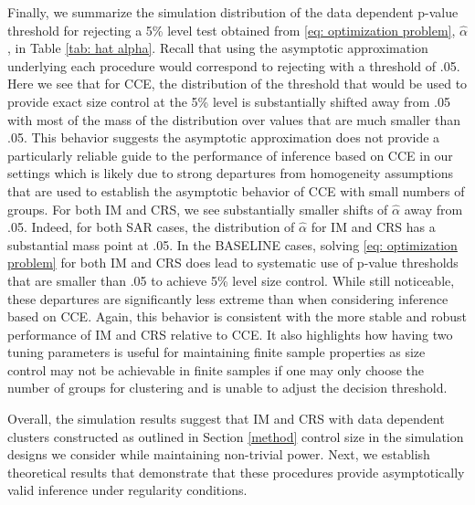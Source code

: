 \documentclass[preprint]{imsart}
\numberwithin{equation}{section}
\theoremstyle{plain}
\theoremstyle{definition}
\renewcommand{\(}{\left(}
\renewcommand{\)}{\right)}
\renewcommand{\[}{\left[}
\renewcommand{\]}{\right]}
\renewcommand{\hat}{\widehat}
\renewcommand{\hat}{\widehat}
\begin{document}
Finally, we summarize the simulation distribution of the data dependent p-value threshold for rejecting a 5\% level test obtained from \eqref{eq: optimization problem}, $\hat\alpha$, in Table \ref{tab: hat alpha}. Recall that using the asymptotic approximation underlying each procedure would correspond to rejecting with a threshold of .05. Here we see that for CCE, the distribution of the threshold that would be used to provide exact size control at the 5\% level is substantially shifted away from .05 with most of the mass of the distribution over values that are much smaller than .05. This behavior suggests the asymptotic approximation does not provide a particularly reliable guide to the performance of inference based on CCE in our settings which is likely due to strong departures from homogeneity assumptions that are used to establish the asymptotic behavior of CCE with small numbers of groups. For both IM and CRS, we see substantially smaller shifts of $\hat\alpha$ away from .05. Indeed, for both SAR cases, the distribution of $\hat\alpha$ for IM and CRS has a substantial mass point at .05. In the BASELINE cases, solving \eqref{eq: optimization problem} for both IM and CRS does lead to systematic use of p-value thresholds that are smaller than .05 to achieve 5\% level size control. While still noticeable, these departures are significantly less extreme than when considering inference based on CCE. Again, this behavior is consistent with the more stable and robust performance of IM and CRS relative to CCE. It also highlights how having two tuning parameters is useful for maintaining finite sample properties as size control may not be achievable in finite samples if one may only choose the number of groups for clustering and is unable to adjust the decision threshold.

Overall, the simulation results suggest that IM and CRS with data dependent clusters constructed as outlined in Section \ref{method} control size in the simulation designs we consider while maintaining non-trivial power. Next, we establish theoretical results that demonstrate that these procedures provide asymptotically valid inference under regularity conditions.   
\end{document}
